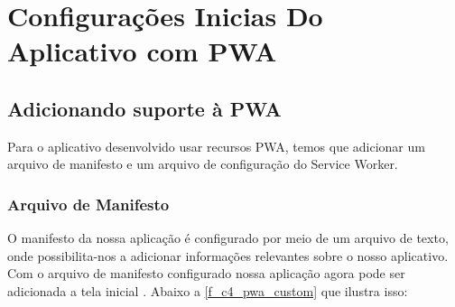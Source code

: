 \section{Configurações Inicias Do Aplicativo com PWA}

\subsection*{Adicionando suporte à PWA}
Para o aplicativo desenvolvido usar recursos PWA, temos que adicionar um arquivo de manifesto e um arquivo de configuração do Service Worker.

\subsubsection{Arquivo de Manifesto}
O manifesto da nossa aplicação é configurado por meio de um arquivo de texto, onde possibilita-nos a adicionar informações relevantes sobre o nosso aplicativo. Com o arquivo de manifesto configurado nossa aplicação agora pode ser adicionada a tela inicial \cite{manifestfile}. Abaixo a \autoref{f_c4_pwa_custom} que ilustra isso:


